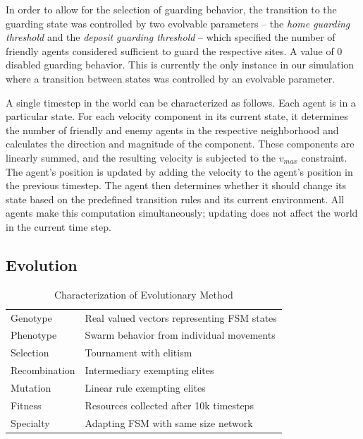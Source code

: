 \documentclass[conference,final]{IEEEtran}
\begin{document}
In order to allow for the selection of guarding behavior, the transition to the guarding state was controlled by two  evolvable parameters -- the \textit{home guarding threshold} and the \textit{deposit guarding threshold} -- which specified the number of friendly agents considered sufficient to guard the respective sites. A value of 0 disabled guarding behavior. This is currently the only instance in our simulation where a transition between states was controlled by an evolvable parameter.

A single timestep in the world can be characterized as follows. Each agent is in a particular state. For each velocity component in its current state, it determines the number of friendly and enemy agents in the respective neighborhood and calculates the direction and magnitude of the component. These components are linearly summed, and the resulting velocity is subjected to the $v_{max}$ constraint. The agent's position is updated by adding the velocity to the agent's position in the previous timestep. The agent then determines whether it should change its state based on the predefined transition rules and its current environment. All agents make this computation simultaneously; updating does not affect the world in the current time step.

\subsection{Evolution}

\begin{table}[t!]
    \renewcommand{\arraystretch}{1.5}
    \centering
    \caption{Characterization of Evolutionary Method}
    \label{table:evolvemethod}
    \begin{tabular}{|l|l|}
        \hline
        Genotype & Real valued vectors representing FSM states \\
        Phenotype & Swarm behavior from individual movements \\
        Selection & Tournament with elitism \\
        Recombination & Intermediary exempting elites \\
        Mutation & Linear rule exempting elites \\
        Fitness & Resources collected after 10k timesteps \\
        Specialty & Adapting FSM with same size network \\
        \hline
    \end{tabular}
\end{table}
\end{document}
